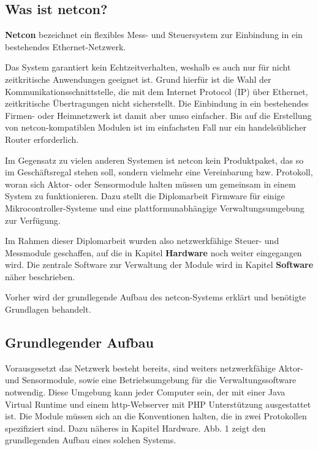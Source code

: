 \documentclass[a4paper,14pt,headsepline]{scrartcl}
\begin{document}
\subsection{Was ist netcon?}
\textbf{Netcon} bezeichnet ein flexibles Mess- und Steuersystem zur Einbindung in ein bestehendes Ethernet-Netzwerk. 

Das System garantiert kein Echtzeitverhalten, weshalb es auch nur für nicht zeitkritische Anwendungen geeignet ist. Grund hierfür ist die Wahl der Kommunikationsschnittstelle, die mit dem Internet Protocol (IP) über Ethernet, zeitkritische Übertragungen nicht sicherstellt. Die Einbindung in ein bestehendes Firmen- oder Heimnetzwerk ist damit aber umso einfacher. Bis auf die Erstellung von netcon-kompatiblen Modulen ist im einfachsten Fall nur ein handelsüblicher Router erforderlich.

Im Gegensatz zu vielen anderen Systemen ist netcon kein Produktpaket, das so im Geschäftsregal stehen soll, sondern vielmehr eine Vereinbarung bzw. Protokoll, woran sich Aktor- oder Sensormodule halten müssen um gemeinsam in einem System zu funktionieren. Dazu stellt die Diplomarbeit Firmware für einige Mikrocontroller-Systeme und eine plattformunabhängige Verwaltungsumgebung zur Verfügung. 

Im Rahmen dieser Diplomarbeit wurden also netzwerkfähige Steuer- und Messmodule geschaffen, auf die in Kapitel \textbf{Hardware} noch weiter eingegangen wird. Die zentrale Software zur Verwaltung der Module wird in Kapitel \textbf{Software} näher beschrieben. 

Vorher wird der grundlegende Aufbau des netcon-Systems erklärt und benötigte Grundlagen behandelt.

\subsection{Grundlegender Aufbau}
Vorausgesetzt das Netzwerk besteht bereits, sind weiters netzwerkfähige Aktor- und Sensormodule, sowie eine Betriebsumgebung für die Verwaltungssoftware notwendig. Diese Umgebung kann jeder Computer sein, der mit einer Java Virtual Runtime und einem http-Webserver mit PHP Unterstützung ausgestattet ist. Die Module müssen sich an die Konventionen halten, die in zwei Protokollen spezifiziert sind. Dazu näheres in Kapitel Hardware. Abb. 1 zeigt den grundlegenden Aufbau eines solchen Systems. 
\end{document}
